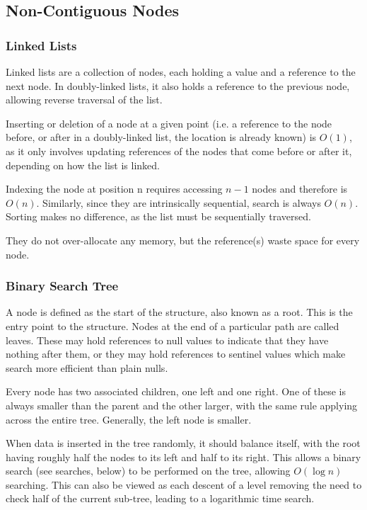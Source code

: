 \documentclass[]{article}
\begin{document}
\pagebreak

\subsection{Non-Contiguous Nodes}

\subsubsection{Linked Lists}

Linked lists are a collection of nodes, each holding a value and a reference to the next node. In doubly-linked lists, it also holds a reference to the previous node, allowing reverse traversal of the list.

Inserting or deletion of a node at a given point (i.e. a reference to the node before, or after in a doubly-linked list, the location is already known) is $O(1)$, as it only involves updating references of the nodes that come before or after it, depending on how the list is linked.

Indexing the node at position n requires accessing $n-1$ nodes and therefore is $O(n)$. Similarly, since they are intrinsically sequential, search is always $O(n)$. Sorting makes no difference, as the list must be sequentially traversed.

They do not over-allocate any memory, but the reference(s) waste space for every node.

\subsubsection{Binary Search Tree}

A node is defined as the start of the structure, also known as a root. This is the entry point to the structure. Nodes at the end of a particular path are called leaves. These may hold references to null values to indicate that they have nothing after them, or they may hold references to sentinel values which make search more efficient than plain nulls.

Every node has two associated children, one left and one right. One of these is always smaller than the parent and the other larger, with the same rule applying across the entire tree. Generally, the left node is smaller.

When data is inserted in the tree randomly, it should balance itself, with the root having roughly half the nodes to its left and half to its right. This allows a binary search (see searches, below) to be performed on the tree, allowing $O(\log{n})$ searching. This can also be viewed as each descent of a level removing the need to check half of the current sub-tree, leading to a logarithmic time search.
\end{document}
